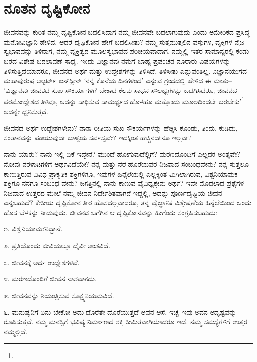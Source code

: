 \section{ನೂತನ ದೃಷ್ಟಿಕೋನ}

ಜೀವನವನ್ನು ಕುರಿತ ನಮ್ಮ ದೃಷ್ಟಿಕೋನ ಬದಲಿಸಿದಾಗ ನಮ್ಮ ಜೀವನವೇ ಬದಲಾಗುವುದು ಎಂದು ಅಮೇರಿಕದ ಪ್ರಸಿದ್ಧ ಮನೋವಿಜ್ಞಾನಿ ಹೇಳಿದ. ಆದರೆ ದೃಷ್ಟಿಕೋನ ಹೇಗೆ ಬದಲಿಸೀತು? ನಮ್ಮ ಸುತ್ತಮುತ್ತಲಿನ ವಸ್ತುಗಳ, ವ್ಯಕ್ತಿಗಳ ನೈಜ ಸ್ವಭಾವವನ್ನು ತಿಳಿದಾಗ, ನಮ್ಮ ವ್ಯಕ್ತಿತ್ವದ ಮೂಲಸ್ವಭಾವದ ಪರಿಚಯವಾದಾಗ, ನಮ್ಮಲ್ಲಿ ಇತರ ಸಾಮಾನ್ಯರಲ್ಲಿ ಕಂಡು ಬರದ ವಿಶೇಷ ಬದಲಾವಣೆ ಸಾಧ್ಯ. ಇಂದು ವಿಜ್ಞಾನವು ನಮಗೆ ಬಾಹ್ಯ ಪ್ರಪಂಚದ ನೂರಾರು ವಿಷಯಗಳನ್ನು ತಿಳಿಸುತ್ತಿದೆಯಾದರೂ, ಜೀವನದ ಅರ್ಥ ಮತ್ತು ಉದ್ದೇಶಗಳನ್ನು ತಿಳಿಸಿದೆ, ತಿಳಿಸೀತು ಎನ್ನುವಂತಿಲ್ಲ. ವಿಜ್ಞಾನಯುಗದ ಮಹಾಪುರುಷ ಆಲ್ಬರ್ಟ್ ಐನ್​ಸ್ಟೀನ್ ‘ನನ್ನ ಕೊನೆಯ ದಿನಗಳಿಂದ’ ಎನ್ನುವ ಗ್ರಂಥದಲ್ಲಿ ಹೇಳಿದ ಈ ಮಾತು– ‘ವಿಜ್ಞಾನವು ಜೀವನದ ಸುಖ ಸೌಕರ್ಯಗಳಿಗೆ ಬೇಕಾದ ಕೆಲವು ಸಾಧನ ಸೌಲಭ್ಯಗಳನ್ನು ಒದಗಿಸಿದರೂ, ಜೀವನದ ಪರಮೋದ್ದೇಶದ ತಿಳಿವೂ, ಅದನ್ನು ಸಾಧಿಸುವ ಸಾಮರ್ಥ್ಯದ ಹೊಳಹೂ ಮತ್ತೊಂದು ಮೂಲದಿಂದಲೇ ಬರಬೇಕು’\footnote{\hfill{}} ಅದನ್ನೇ ಧ್ವನಿಸುತ್ತದೆ.

ಜೀವನದ ಅರ್ಥ ಉದ್ದೇಶಗಳೇನು? ನಾನಾ ರೀತಿಯ ಸುಖ ಸೌಕರ್ಯಗಳನ್ನು ಹೆಚ್ಚಿಸಿ ಕೊಂಡು, ತಿಂದು, ಕುಡಿದು, ಸಂತಾನವನ್ನು ಪಡೆಯುವುದೇ ಬಾಳ್ವೆಯ ಸರ್ವಸ್ವವೇ? ಇದಕ್ಕಿಂತ ಹೆಚ್ಚಿನದೇನೂ ಇಲ್ಲವೇ?

ನಾನು ಯಾರು? ನಾನು ಇಲ್ಲಿ ಏಕೆ ಇದ್ದೇನೆ? ಮುಂದೆ ಹೋಗುವುದೆಲ್ಲಿಗೆ? ಮರಣದೊಂದಿಗೆ ಎಲ್ಲದರ ಅಂತ್ಯವೇ? ನೋವು ನರಳಾಟಗಳಿಗೆ ಅರ್ಥವಿದೆಯೇ? ನನ್ನ ಮತ್ತು ನೆರೆ ಹೊರೆಯವರ ನಿಜವಾದ ಸಂಬಂಧವೇನು? ನನ್ನ ಸುತ್ತಲೂ ಕಾಣುತ್ತಿರುವ ವಿವಿಧ ಪ್ರಾಕೃತಿಕ ಶಕ್ತಿಗಳಿಗೂ, ಇವುಗಳ ಹಿನ್ನೆಲೆಯಲ್ಲಿ ಎಲ್ಲಕ್ಕಿಂತ ಮಿಗಿಲಾಗಿರುವ, ವಿಶ್ವನಿಯಾಮಕ ಶಕ್ತಿಗೂ ನನಗೂ ಸಂಬಂಧ ವೇನು? ಜಗತ್ತಿನಲ್ಲಿ ನಾನು ಕಾಣುವ ವೈವಿಧ್ಯಕ್ಕೇನು ಅರ್ಥ? ಇವೇ ಮೊದಲಾದ ಪ್ರಶ್ನೆಗಳ ನಿಜವಾದ ಉತ್ತರದ ಮೇಲೆ ನಮ್ಮ ಜೀವನ ನಿರ್ದೇಶಿತವಾಗದೆ ಇದ್ದಲ್ಲಿ, ಅದನ್ನು ಪೂರ್ಣದೃಷ್ಟಿಯ ಜೀವನ ಎನ್ನಬಹುದೆ? ಕೇಸೀಯ ದೃಷ್ಟಿಕೋನ ತೀರ ಹೊಸದಲ್ಲವಾದರೂ, ತನ್ನ ವೈಜ್ಞಾನಿಕ ವಿಶ್ಲೇಷಣೆಯ ಹಿನ್ನೆಲೆಯಿಂದ ಒಂದು ಹೊಸ ಬೆಳಕನ್ನು ನೀಡುವುದು. ಜೀವನದ ಬಗೆಗಿನ ಆ ದೃಷ್ಟಿಕೋನವನ್ನು ಹೀಗೆಂದು ಸಂಗ್ರಹಿಸಬಹುದು:

೧. ವಿಶ್ವನಿಯಾಮಕನಿದ್ದಾನೆ.

೨. ಪ್ರತಿಯೊಂದು ಜೀವಿಯಲ್ಲೂ ದೈವೀ ಅಂಶವಿದೆ.

೩. ಜೀವನಕ್ಕೆ ಅರ್ಥ ಉದ್ದೇಶಗಳಿವೆ.

೪. ಮರಣದೊಂದಿಗೆ ಜೀವನ ನಾಶವಾಗದು.

೫. ಜೀವನವನ್ನು ನಿಯಂತ್ರಿಸುವ ಸೂಕ್ಷ್ಮನಿಯಮವಿದೆ.

೬. ಮನುಷ್ಯನಿಗೆ ಏನು ಬೇಕೋ ಅದು ದೊರೆತೇ ದೊರೆಯುತ್ತದೆ ಅವನ ಆಸೆ, ಇಚ್ಛೆ–ಇವು ಅವನ ಅದೃಷ್ಟವನ್ನು ರೂಪಿಸುತ್ತವೆ. ನಮ್ಮ ಮನಸ್ಸಿಗೆ ಭವಿಷ್ಯ ನಿರ್ಮಾಣದ ಶಕ್ತಿ ಸೀಮಿತವಾಗಿಯಾದರೂ ಇದೆ. ನಮ್ಮ ಸಮಸ್ಯೆಗಳಿಗೆ ಉತ್ತರ ನಮ್ಮಲ್ಲಿದೆ.

